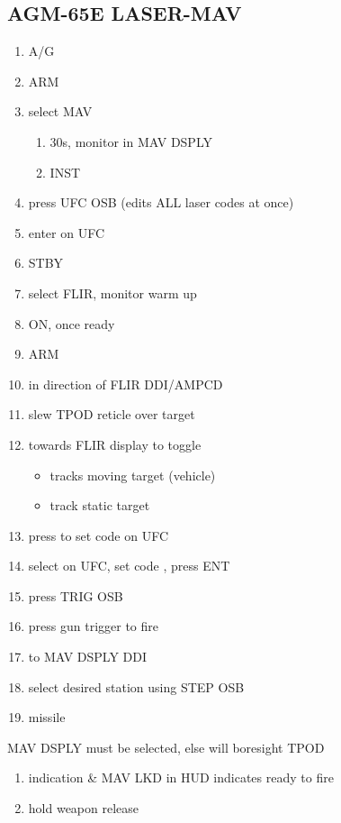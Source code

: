 \documentclass[fontHelvetica, widesubsec]{TechCheck}
\begin{document}
	\subsection{AGM-65E LASER-MAV}
	\begin{enumerate}
		\item {}\dotfill A/G
		\item {}\dotfill ARM
		\item {}\dotfill select MAV
		\begin{enumerate}
			\item {}\dotfill 30s, monitor in MAV DSPLY
			\item {}\dotfill INST
		\end{enumerate}
		\item {}\dotfill press UFC OSB (edits ALL laser codes at once)
		\item {}\dotfill enter on UFC
		\item {}\dotfill STBY
		\item {}\dotfill select FLIR, monitor warm up
		\item {}\dotfill ON, once ready
		\item {}\dotfill ARM
		\item {}\dotfill in direction of FLIR DDI/AMPCD
		\item {}\dotfill slew TPOD reticle over target
		\item {}\dotfill towards FLIR display to toggle
		\begin{itemize}
			\item {} tracks moving target (vehicle)
			\item {} track static target
		\end{itemize}
	\item {}\dotfill press to set code on UFC
	\item {}\dotfill select on UFC, set code , press ENT
	\item {}\dotfill press TRIG OSB
	\item {}\dotfill press gun trigger to fire
	\item {}\dotfill to MAV DSPLY DDI
	\item {}\dotfill select desired station using STEP OSB
	\item {}\dotfill missile
	\end{enumerate}
	\thumbnar
	 MAV DSPLY must be selected, else will boresight TPOD
	\begin{enumerate}[resume]
	\item {}\dotfill indication \& MAV LKD in HUD indicates ready to fire
	\item {}\dotfill hold weapon release
	\end{enumerate}
\end{document}
